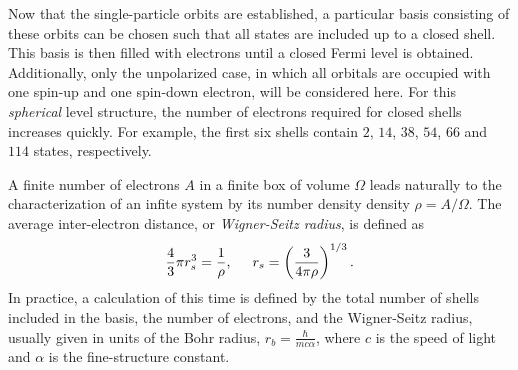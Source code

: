 \documentclass[thesis.tex]{subfiles}
\begin{document}
Now that the single-particle orbits are established, a particular basis consisting of these orbits can be chosen such that all states are included up to a closed shell.  This basis is then filled with electrons until a closed Fermi level is obtained.  Additionally, only the unpolarized case, in which all orbitals are occupied with one spin-up and one spin-down electron, will be considered here.  For this \textit{spherical} level structure, the number of electrons required for closed shells increases quickly.  For example, the first six shells contain $2$, $14$, $38$, $54$, $66$ and $114$ states, respectively.

A finite number of electrons $A$ in a finite box of volume $\Omega$ leads naturally to the characterization of an infite system by its number density density $\rho = A/\Omega$.  The average inter-electron distance, or \textit{Wigner-Seitz radius}, is defined as
\begin{equation} \label{wigner-seitz}
  \frac{4}{3}\pi r_{s}^{3} = \frac{1}{\rho},\hspace{0.5cm} r_{s} = \left(\frac{3}{4\pi\rho}\right)^{1/3}.
\end{equation}
In practice, a calculation of this time is defined by the total number of shells included in the basis, the number of electrons, and the Wigner-Seitz radius, usually given in units of the Bohr radius, $r_{b} = \frac{\hbar}{mc\alpha}$, where $c$ is the speed of light and $\alpha$ is the fine-structure constant.
\end{document}
